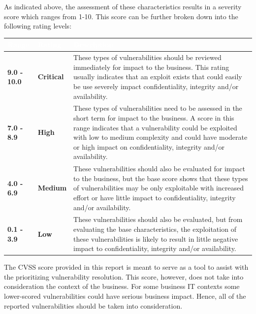 \documentclass{article}
\begin{document}
            \large As indicated above, the assessment of these characteristics results in a severity score which ranges
            from 1-10. This score can be further broken down into the following rating levels: \\
            \newpage
            \begin{center}
                \begin{longtable} {|p{4.5em}|p{4.5em}|p{30em}|}
                \hline 
                \large \cellcolor{tablecol} \textcolor{white}{\textbf{Range}} & \large \cellcolor{tablecol} \textcolor{white}{\textbf{Rating}} & \large \textcolor{white}{\cellcolor{tablecol} \textbf{Description}}   \\    
                \hline
                \normalsize \textbf{9.0 - 10.0} & \normalsize \textcolor{critical}{\textbf{Critical}} & \normalsize These types of vulnerabilities should be reviewed immediately for impact to the
                business. This rating usually indicates that an exploit exists that could easily be use
                severely impact confidentiality, integrity and/or availability.  \\
                \hline
                \normalsize \textbf{7.0 - 8.9} & \normalsize \textcolor{high}{\textbf{High}} & \normalsize These types of vulnerabilities need to be assessed in the short term for impact to the
                business. A score in this range indicates that a vulnerability could be exploited with
                low to medium complexity and could have moderate or high impact on confidentiality,
                integrity and/or availability.  \\
                \hline
                \normalsize \textbf{4.0 - 6.9} & \normalsize \textcolor{medium}{\textbf{Medium}} & \normalsize These vulnerabilities should also be evaluated for impact to the business, but the
                base score shows that these types of vulnerabilities may be only exploitable with
                increased effort or have little impact to confidentiality, integrity and/or availability.  \\
                \hline
                \normalsize \textbf{0.1 - 3.9}  & \normalsize \textcolor{low}{\textbf{Low}} & \normalsize These vulnerabilities should also be evaluated, but from evaluating the base
                characteristics, the exploitation of these vulnerabilities is likely to result in little
                negative impact to confidentiality, integrity and/or availability.  \\
                \hline
                \end{longtable}   
            \end{center}
            \large The CVSS score provided in this report is meant to serve as a tool to assist with the prioritizing
            vulnerability resolution. This score, however, does not take into consideration the context of the
            business. For some business IT contexts some lower-scored vulnerabilities could have serious
            business impact. Hence, all of the reported vulnerabilities should be taken into consideration.
\end{document}
